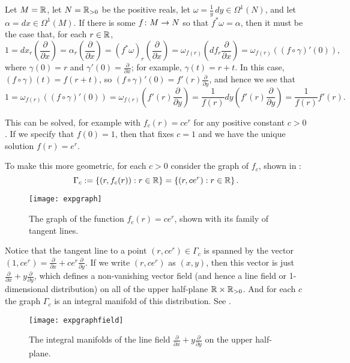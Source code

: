 \begin{example}
	Let $M = \mathbb{R}$, let $N = \mathbb{R}_{>0}$ be the positive reals, let $\omega = \frac{1}{y} \, dy \in \Omega^1(N)$, and let $\alpha = dx \in \Omega^1(M)$. If there is some $f \colon\thinspace\! M \to N$ so that $f^\ast \omega = \alpha$, then it must be the case that, for each $r \in \mathbb{R}$,
	\[
		1 = dx_r\left(\frac{\partial}{\partial x} \right) = \alpha_r\left(\frac{\partial}{\partial x} \right) = (f^\ast \omega)_r\left(\frac{\partial}{\partial x} \right) = \omega_{f(r)} \left(df_r\frac{\partial}{\partial x} \right) = \omega_{f(r)} \left((f\circ \gamma)'(0)\right),
	\]
	where $\gamma(0) = r$ and $\gamma'(0) = \frac{\partial}{\partial x}$; for example, $\gamma(t) = r+t$. In this case, $(f\circ \gamma)(t) = f(r+t)$, so $(f\circ \gamma)'(0) = f'(r) \frac{\partial}{\partial y}$, and hence we see that
	\[
		1 = \omega_{f(r)} \left((f\circ \gamma)'(0)\right) = \omega_{f(r)}\left( f'(r) \frac{\partial}{\partial y}\right) = \frac{1}{f(r)} dy \left( f'(r) \frac{\partial}{\partial y}\right) = \frac{1}{f(r)}f'(r).
	\]
	
	This can be solved, for example with $f_c(r) = c e^r$ for any positive constant $c > 0$. If we specify that $f(0) = 1$, then that fixes $c=1$ and we have the unique solution $f(r) = e^r$.
	
	To make this more geometric, for each $c > 0$ consider the graph of $f_c$, shown in :
	\[
		\Gamma_c := \left\{ \left(r, f_c(r) \right) : r \in \mathbb{R}\right\} = \left\{ \left(r, ce^r \right) : r \in \mathbb{R}\right\}.
	\]
	\begin{figure}[htbp]
		\centering
			\texttt{[image: expgraph]}
		\caption{The graph of the function $f_c(r) = ce^r$, shown with its family of tangent lines.}
		\label{fig:exp graph}
	\end{figure}
	Notice that the tangent line to a point $(r, ce^r) \in \Gamma_c$ is spanned by the vector $(1,ce^r) = \frac{\partial}{\partial x} + c e^r \frac{\partial}{\partial y}$. If we write $(r, ce^r)$ as $(x,y)$, then this vector is just $\frac{\partial}{\partial x} + y \frac{\partial}{\partial y}$, which defines a non-vanishing vector field (and hence a line field or 1-dimensional distribution) on all of the upper half-plane $\mathbb{R} \times \mathbb{R}_{>0}$. And for each $c$ the graph $\Gamma_c$ is an integral manifold of this distribution. See .
	\begin{figure}[htbp]
		\centering
			\texttt{[image: expgraphfield]}
		\caption{The integral manifolds of the line field $\frac{\partial}{\partial x} + y \frac{\partial}{\partial y}$ on the upper half-plane.}
		\label{fig:exp line field}
	\end{figure}
	

\end{example}
